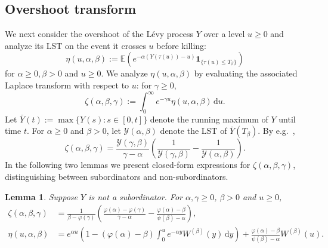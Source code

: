 \documentclass[reqno,12pt]{amsart}
\newcommand{\bs}{\boldsymbol}
\newtheorem{lemma}{Lemma}
\begin{document}

\subsection{Overshoot transform}\label{sec: prelim overshoot transform}
We next consider the overshoot of the L\'evy process $Y$ over a level $u \geqslant 0$ and analyze its LST on the event it crosses $u$ before killing:
\begin{equation*}
    \eta(u, \alpha, \beta) := \mathbb{E}\left(e^{-\alpha(Y(\tau(u)) - u)}{\bs 1}_{\{\tau(u) \leqslant T_\beta\}}\right)
\end{equation*}
for $\alpha\geqslant0, \beta>0$ and $u\geqslant0$. We analyze $\eta(u,\alpha,\beta)$ by evaluating the associated Laplace transform with respect to $u$: for $\gamma\geqslant0$,
\begin{equation}
    \zeta(\alpha, \beta, \gamma) := \int_0^\infty e^{-\gamma u}\eta(u,\alpha, \beta)\,\mathrm{d}u.
\end{equation}
Let $\bar{Y}(t) := \max\{Y(s): s\in[0,t]\}$ denote the running maximum of $Y$ until time $t$. For $\alpha\geqslant0$ and $\beta>0$, let $\mathscr{Y}(\alpha, \beta)$ denote the LST of $\bar{Y}(T_\beta)$. By e.g.\ \cite[Section 16.3]{DM},
\begin{equation}\label{eq: zeta in terms of LST}
    \zeta(\alpha, \beta, \gamma) = \frac{\mathscr{Y}(\gamma,\beta)}{\gamma-\alpha}\left(\frac{1}{\mathscr{Y}(\gamma,\beta)}-\frac{1}{\mathscr{Y}(\alpha,\beta)}\right).
\end{equation}
In the following two lemmas we present closed-form expressions for $\zeta(\alpha,\beta,\gamma)$, distinguishing between subordinators and non-subordinators.
\begin{lemma}\label{lemma: eta and zeta Levy}
    Suppose $Y$ is not a subordinator. For $\alpha, \gamma \geqslant 0$, $\beta >0$ and $u\geqslant0$,
    \begin{align}\label{eq: zeta Levy nonsub}
        \zeta(\alpha, \beta, \gamma) &= \frac{1}{\beta - \varphi(\gamma)} \left( \frac{\varphi(\alpha) - \varphi(\gamma)}{\gamma - \alpha} - \frac{\varphi(\alpha) - \beta}{\psi(\beta) - \alpha} \right),\\
    \label{eq: eta Levy nonsub}
        \eta(u,\alpha,\beta)& = e^{\alpha u}\left(1-(\varphi(\alpha) - \beta)\int_0^u e^{-\alpha y}W^{(\beta)}(y)\,\mathrm{d}y\right) + \frac{\varphi(\alpha) - \beta}{\psi(\beta) - \alpha} W^{(\beta)}(u). 
    \end{align}
\end{lemma}
\end{document}
